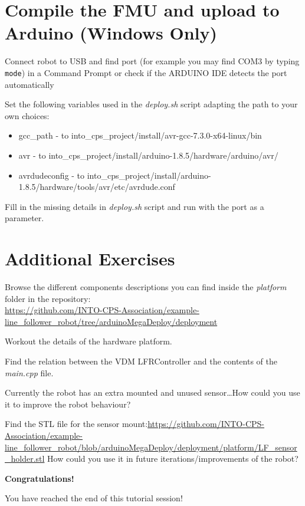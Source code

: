 \documentclass[11pt,a4paper]{../tutorial}
\begin{document}
\section{Compile the FMU and upload to Arduino (Windows Only)}


\begin{instructions} 
\item Connect robot to USB and find port (for example you may find COM3 by typing \verb'mode') in a Command Prompt or check if the ARDUINO IDE detects the port automatically 

\item Set the following variables used in the \emph{deploy.sh} script adapting the path to your own choices:
	\begin{itemize}
		\item gcc\_path - to into\_cps\_project/install/avr-gcc-7.3.0-x64-linux/bin 
		\item avr - to into\_cps\_project/install/arduino-1.8.5/hardware/arduino/avr/ 
		\item avrdudeconfig - to into\_cps\_project/install/arduino-1.8.5/hardware/tools/avr/etc/avrdude.conf
	\end{itemize}

\item Fill in the missing details in \emph{deploy.sh} script and run with the port as a parameter. 

\end{instructions}

\section{Additional Exercises}

\begin{instructions} 

\item Browse the different components descriptions you can find inside the \emph{platform} folder in the repository:\\
\url{https://github.com/INTO-CPS-Association/example-line\_follower\_robot/tree/arduinoMegaDeploy/deployment}

\item Workout the details of the hardware platform.

\item Find the relation between the VDM LFRController and the contents of the \emph{main.cpp} file.

\item Currently the robot has an extra mounted and unused sensor\ldots How could you use it to improve the robot behaviour?

\item Find the STL file for the sensor mount:\url{https://github.com/INTO-CPS-Association/example-line_follower_robot/blob/arduinoMegaDeploy/deployment/platform/LF_sensor_holder.stl} How could you use it in future iterations/improvements of the robot? 

\end{instructions}

    \bigskip
    \bigskip
    {\large\bfseries Congratulations!}

    You have reached the end of this tutorial session! 
\end{document}
